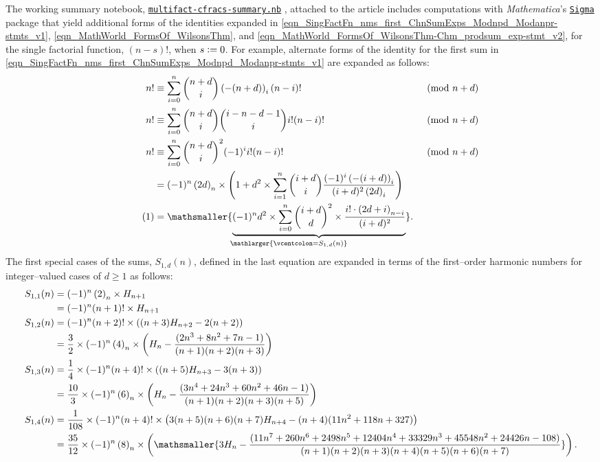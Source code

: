 \documentclass[12pt,reqno]{article}
\numberwithin{sfootnote}{section}
\numberwithin{equation}{section}
\newcommand{\tagonce}[0]{
     \addtocounter{equation}{1}
     \tag{\theequation}
}
\theoremstyle{DefaultTheoremStyle}
\theoremstyle{definition}
\newcommand{\defequals}{\ensuremath{\vcentcolon=}}
\newcommand{\undersetbrace}[2]{\ensuremath{\underset{\mathlarger{#1}}{\mathsmaller{\underbrace{#2}}}}}
\newcommand{\TheSummaryNBFile}[0]{\texttt{multifact-cfracs-summary.nb}}
\newcommand{\TheSummaryNBFileGoogleDriveLink}[0]{https://drive.google.com/file/d/0B6na6iIT7ICZRFltbTVVcmVpVk0/view?usp=drivesdk}
\renewcommand{\TheSummaryNBFile}{ 
     \href{\TheSummaryNBFileGoogleDriveLink}{\texttt{multifact-cfracs-summary.nb}}%
}
\newcommand{\Mm}[0]{\emph{Mathematica}}
\newcommand{\SigmaPkg}[0]{%
     \href{http://www.risc.jku.at/research/combinat/software/Sigma/index.php}{%
     \texttt{Sigma}}
}
\newcommand{\gkpEII}[2]{\ensuremath{\left\langle\genfrac{\langle}{\rangle}{
            0pt}{}{#1}{#2}\right\rangle}}
\newcommand{\Pochhammer}[2]{\ensuremath{\left(#1\right)_{#2}}}
\begin{document}
The working summary notebook, \TheSummaryNBFile, 
attached to the article \citep{SUMMARYNBREF-STUB} 
includes computations with \Mm's \SigmaPkg package 
that yield additional forms of the identities expanded in 
\eqref{eqn_SingFactFn_nms_first_ChnSumExps_Modnpd_Modanpr-stmts_v1}, 
\eqref{eqn_MathWorld_FormsOf_WilsonsThm}, and 
\eqref{eqn_MathWorld_FormsOf_WilsonsThm-Chm_prodsum_exp-stmt_v2}, 
for the single factorial function, $(n-s)!$, when $s \defequals 0$. 
For example, 
alternate forms of the identity for the first sum in 
\eqref{eqn_SingFactFn_nms_first_ChnSumExps_Modnpd_Modanpr-stmts_v1} are 
expanded as follows: 
\begin{align*} 
n! & \equiv 
     \sum_{i=0}^{n} \binom{n+d}{i} 
     \Pochhammer{-(n+d)}{i} (n-i)! && \pmod{n+d} \\ 
n! & \equiv 
     \sum_{i=0}^{n} \binom{n+d}{i} \binom{i-n-d-1}{i} i! (n-i)! 
     && \pmod{n+d} \\ 
n! & \equiv 
     \sum_{i=0}^{n} \binom{n+d}{i}^{2} (-1)^{i} i! (n-i)! && \pmod{n+d} \\ 
   & = 
     (-1)^{n} \Pochhammer{2d}{n} \times \left( 
     1 + d^2 \times \sum_{i=1}^{n} \binom{i+d}{i} 
     \frac{(-1)^{i} \Pochhammer{-(i+d)}{i}}{(i+d)^2 \Pochhammer{2d}{i}} 
     \right) && \\ 
\tagonce\label{eqn_SingFactFn_nms_first_ChnSumExps_Modnpd_Modanpr-stmts_v2} 
   & = 
   \undersetbrace{\defequals S_{1,d}(n)}{ 
   (-1)^{n} d^{2} \times \sum_{i=0}^{n} \binom{i+d}{d}^{2} \times 
   \frac{i! \cdot \Pochhammer{2d+i}{n-i}}{(i+d)^{2}}
   }. && 
\end{align*} 
The first special cases of the sums, $S_{1,d}(n)$, 
defined in the last equation 
are expanded in terms of the first--order harmonic numbers 
for integer--valued cases of $d \geq 1$ as follows: 
\begin{align*} 
S_{1,1}(n) & = 
     (-1)^{n} \Pochhammer{2}{n} \times H_{n+1} \\ 
     & = 
     (-1)^{n} (n+1)! \times H_{n+1} \\ 
S_{1,2}(n) & = 
     (-1)^{n} (n+2)! \times \left( 
     (n+3) H_{n+2} - 2(n+2) 
     \right) \\ 
     & = 
     \frac{3}{2} \times (-1)^{n} \Pochhammer{4}{n} \times \left( 
     H_{n} - \frac{(2n^3+8n^2+7n-1)}{(n+1)(n+2)(n+3)} 
     \right) \\ 
S_{1,3}(n) & = 
     \frac{1}{4} \times (-1)^{n} (n+4)! \times \left( 
     (n+5) H_{n+3} - 3(n+3) 
     \right) \\ 
     & = 
     \frac{10}{3} \times (-1)^{n} \Pochhammer{6}{n} \times \left( 
     H_{n} - \frac{(3n^4+24n^3+60n^2+46n-1)}{(n+1)(n+2)(n+3)(n+5)} 
     \right) \\ 
S_{1,4}(n) & = 
     \frac{1}{108} \times (-1)^{n} (n+4)! \times \left( 
     3(n+5)(n+6)(n+7) H_{n+4} - (n+4)(11n^2+118n+327)  
     \right) \\ 
     & = 
     \frac{35}{12} \times (-1)^{n} \Pochhammer{8}{n} \times \left( 
     \mathsmaller{ 
     3 H_{n} - 
     \frac{(11n^7+260n^6+2498n^5+12404n^4+33329n^3+45548n^2+24426n-108)}{ 
     (n+1)(n+2)(n+3)(n+4)(n+5)(n+6)(n+7)} 
     } 
     \right). 
\end{align*} 
\end{document}
